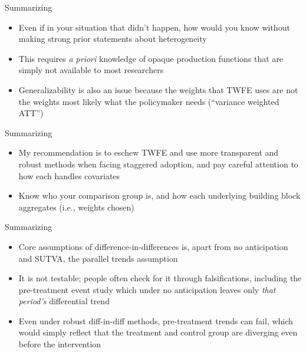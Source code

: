 \documentclass{beamer}
\begin{document}
\begin{frame}{Summarizing}

\begin{itemize}
\item Even if in your situation that didn't happen, how would you know without making strong prior statements about heterogeneity
\item This requires \emph{a priori} knowledge of opaque production functions that are simply not available to most researchers
\item Generalizability is also an issue because the weights that TWFE uses are not the weights most likely what the policymaker needs (``variance weighted ATT'')

\end{itemize}

\end{frame}

\begin{frame}{Summarizing}

\begin{itemize}

\item My recommendation is to eschew TWFE and use more transparent and robust methods when facing staggered adoption, and pay careful attention to how each handles covariates
\item Know who your comparison group is, and how each underlying building block aggregates (i.e., weights chosen)

\end{itemize}

\end{frame}

\begin{frame}{Summarizing}

\begin{itemize}

\item Core assumptions of difference-in-differences is, apart from no anticipation and SUTVA, the parallel trends assumption
\item It is not testable; people often check for it through falsifications, including the pre-treatment event study which under no anticipation leaves only \emph{that period's} differential trend
\item Even under robust diff-in-diff methods, pre-treatment trends can fail, which would simply reflect that the treatment and control group are diverging even before the intervention

\end{itemize}

\end{frame}
\end{document}
